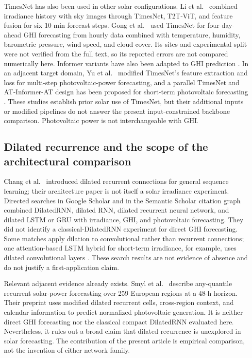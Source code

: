 TimesNet has also been used in other solar configurations. Li et al.\
\cite{li2025timesnet} combined irradiance history with sky images through
TimesNet, T2T-ViT, and feature fusion for six 10-min forecast steps. Gong et
al.\ \cite{gong2024timesnet} used TimesNet for four-day-ahead GHI forecasting
from hourly data combined with temperature, humidity, barometric pressure,
wind speed, and cloud cover. Its sites and experimental split were not
verified from the full text, so its reported errors are not compared
numerically here. Informer variants have also been adapted to GHI
prediction \cite{chen2026informer}. In an adjacent target domain, Yu et al.\
\cite{yu2025timesnet} modified TimesNet's feature extraction and loss for
multi-step photovoltaic-power forecasting, and a parallel TimesNet and
AT-Informer-AT design has been proposed for short-term photovoltaic
forecasting \cite{yu2026parallel}.
These studies establish prior solar use of TimesNet, but their additional
inputs or modified pipelines do not answer the present input-constrained
backbone comparison. Photovoltaic power is not interchangeable with GHI.

\subsection{Dilated recurrence and the scope of the architectural comparison}

Chang et al.\ \cite{chang2017} introduced dilated recurrent connections for
general sequence learning; their architecture paper is not itself a solar
irradiance experiment. Directed searches in Google Scholar and in the
Semantic Scholar citation graph combined DilatedRNN, dilated RNN, dilated
recurrent neural network, and dilated LSTM or GRU with irradiance, GHI, and
photovoltaic forecasting. They did not identify a classical-DilatedRNN
experiment for direct GHI forecasting. Some matches apply dilation to
convolutional rather than recurrent connections; one attention-based LSTM
hybrid for short-term irradiance, for example, uses dilated convolutional
layers \cite{molu2024hybrid}. These search results are not evidence of
absence and do not justify a first-application claim.

Relevant adjacent evidence already exists. Smyl et al.\
\cite{smyl2026solar} describe any-quantile recurrent solar-power forecasting
over 259 European regions at a 48-h horizon. Their preprint uses modified
dilated recurrent cells, cross-region context, and calendar information to
predict normalized photovoltaic generation. It is neither direct GHI
forecasting nor the classical compact DilatedRNN evaluated here. Nevertheless,
it rules out a broad claim that dilated recurrence is unexplored in solar
forecasting. The contribution of the present article is empirical comparison,
not the invention of either network family.

